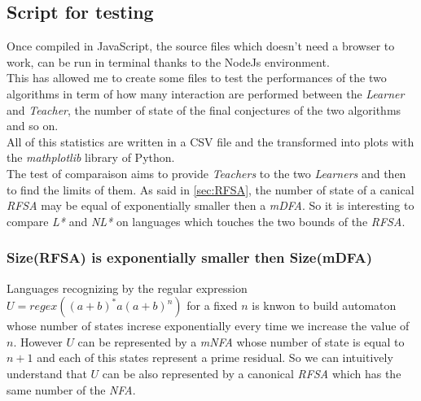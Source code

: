 \subsection{Script for testing}
Once compiled in JavaScript, the source files which doesn't need a browser to work, can be run in terminal thanks to the NodeJs environment. \\
This has allowed me to create some files to test the performances of the two algorithms in term of how many interaction are performed between the \textit{Learner} and \textit{Teacher}, the number of state of the final conjectures of the two algorithms and so on. \\
All of this statistics are written in a CSV file and the transformed into plots with the \textit{mathplotlib} library of Python.\\
The test of comparaison aims to provide \textit{Teachers} to the two \textit{Learners} and then to find the limits of them. As said in \cref{sec:RFSA}, the number of state of a canical \textit{RFSA} may be equal of exponentially smaller then a \textit{mDFA}. So it is interesting to compare \textit{L*} and \textit{NL*} on languages which touches the two bounds of the \textit{RFSA}.


\subsubsection{Size(RFSA) is exponentially smaller then Size(mDFA)}
Languages recognizing by the regular expression $U = regex((a+b)^*a(a+b)^n)$ for a fixed $n$ is knwon to build automaton whose number of states increse exponentially every time we increase the value of $n$. However $U$ can be represented by a \textit{mNFA} whose number of state is equal to $n+1$ and each of this states represent a prime residual. So we can intuitively understand that $U$ can be also represented by a canonical \textit{RFSA} which has the same number of the \textit{NFA}.

